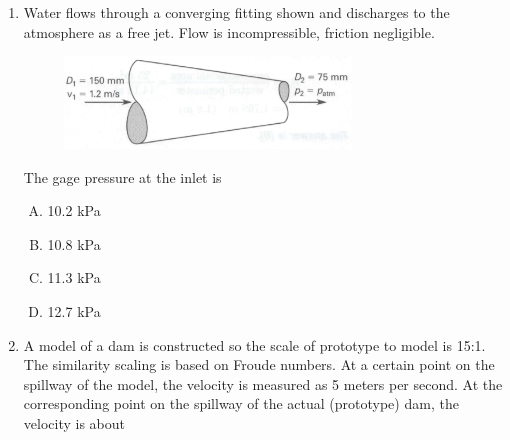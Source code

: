 \documentclass[12pt]{article}
\begin{document}
\begin{enumerate}


\item Water flows through a converging fitting shown and discharges to the atmosphere as a free jet.
Flow is incompressible, friction negligible.

\begin{figure}[htbp] %
   \centering
   \includegraphics[width=3in]{nozzle.png} 
   \caption{}
   \label{fig:nozzle}
\end{figure}

The gage pressure at the inlet is
\begin{enumerate}[A)]
\item 10.2 kPa
\item 10.8 kPa
\item 11.3 kPa
\item 12.7 kPa
\end{enumerate}

\clearpage

\item A model of a dam is constructed so the scale of prototype to model is 15:1.  The similarity scaling is based on Froude numbers.  At a certain point on the spillway of the model, the velocity is measured as 5 meters per second. At the corresponding point on the spillway of the actual (prototype) dam, the velocity is about


\end{enumerate}
\end{document}
